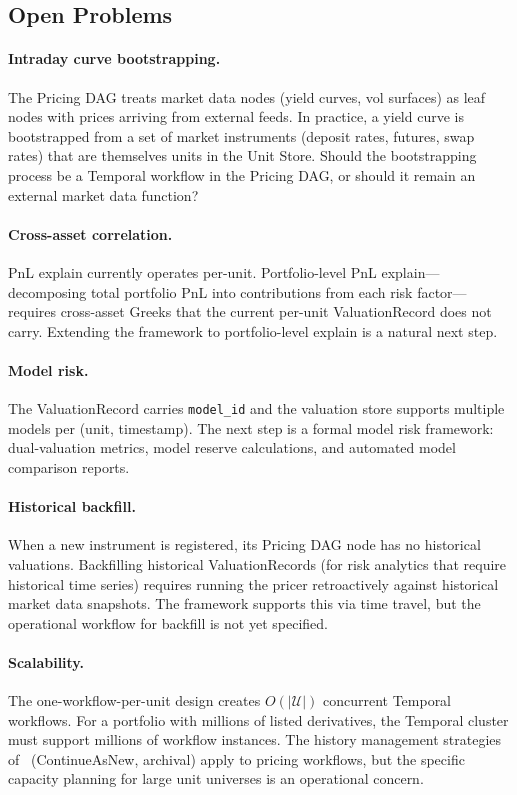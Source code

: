 \documentclass[11pt,a4paper]{article}
\begin{document}
\subsection{Open Problems}

\paragraph{Intraday curve bootstrapping.}  The Pricing DAG treats market data nodes (yield curves, vol surfaces) as leaf nodes with prices arriving from external feeds.  In practice, a yield curve is bootstrapped from a set of market instruments (deposit rates, futures, swap rates) that are themselves units in the Unit Store.  Should the bootstrapping process be a Temporal workflow in the Pricing DAG, or should it remain an external market data function?

\paragraph{Cross-asset correlation.}  PnL explain currently operates per-unit.  Portfolio-level PnL explain---decomposing total portfolio PnL into contributions from each risk factor---requires cross-asset Greeks that the current per-unit ValuationRecord does not carry.  Extending the framework to portfolio-level explain is a natural next step.

\paragraph{Model risk.}  The ValuationRecord carries \texttt{model\_id} and the valuation store supports multiple models per (unit, timestamp).  The next step is a formal model risk framework: dual-valuation metrics, model reserve calculations, and automated model comparison reports.

\paragraph{Historical backfill.}  When a new instrument is registered, its Pricing DAG node has no historical valuations.  Backfilling historical ValuationRecords (for risk analytics that require historical time series) requires running the pricer retroactively against historical market data snapshots.  The framework supports this via time travel, but the operational workflow for backfill is not yet specified.

\paragraph{Scalability.}  The one-workflow-per-unit design creates $O(|\mathcal{U}|)$ concurrent Temporal workflows.  For a portfolio with millions of listed derivatives, the Temporal cluster must support millions of workflow instances.  The history management strategies of~\cite[\S14.12]{ledger} (ContinueAsNew, archival) apply to pricing workflows, but the specific capacity planning for large unit universes is an operational concern.
\end{document}
